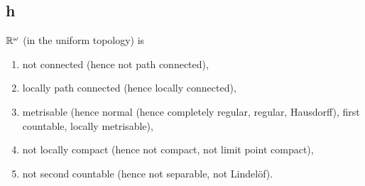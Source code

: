\subsection*{h}
  $\mathbb{R}^\omega$ (in the uniform topology) is
  \begin{enumerate}
  \item not connected (hence not path connected),
  \item locally path connected (hence locally connected),
  \item metrisable (hence normal (hence completely regular, regular, Hausdorff), first countable, locally metrisable),
  \item not locally compact (hence not compact, not limit point compact),
  \item not second countable (hence not separable, not Lindel\"of). 
  \end{enumerate}

